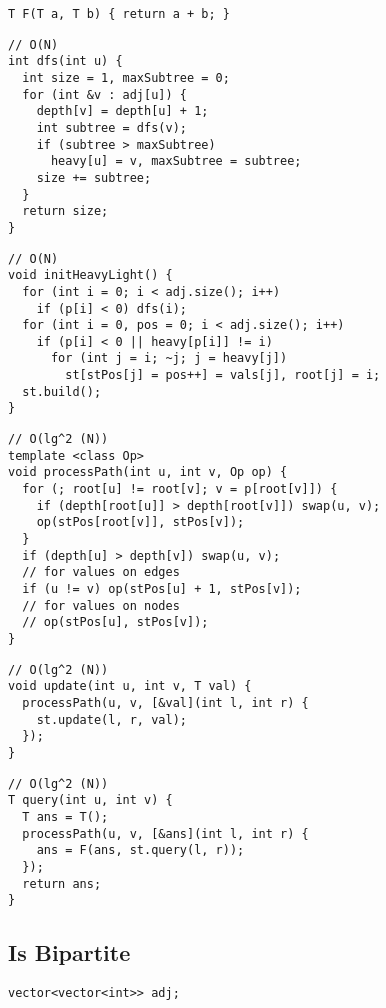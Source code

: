 \documentclass[twoside]{article}
\newcommand{\fileTitleStyle}{\large\underline}
\begin{document}
\begin{multicols*}{2}
\begin{verbatim}
T F(T a, T b) { return a + b; }
\end{verbatim}
\vspace{-12pt}
\begin{verbatim}
// O(N)
int dfs(int u) {
  int size = 1, maxSubtree = 0;
  for (int &v : adj[u]) {
    depth[v] = depth[u] + 1;
    int subtree = dfs(v);
    if (subtree > maxSubtree)
      heavy[u] = v, maxSubtree = subtree;
    size += subtree;
  }
  return size;
}
\end{verbatim}
\vspace{-12pt}
\begin{verbatim}
// O(N)
void initHeavyLight() {
  for (int i = 0; i < adj.size(); i++)
    if (p[i] < 0) dfs(i);
  for (int i = 0, pos = 0; i < adj.size(); i++)
    if (p[i] < 0 || heavy[p[i]] != i)
      for (int j = i; ~j; j = heavy[j])
        st[stPos[j] = pos++] = vals[j], root[j] = i;
  st.build();
}
\end{verbatim}
\vspace{-12pt}
\begin{verbatim}
// O(lg^2 (N))
template <class Op>
void processPath(int u, int v, Op op) {
  for (; root[u] != root[v]; v = p[root[v]]) {
    if (depth[root[u]] > depth[root[v]]) swap(u, v);
    op(stPos[root[v]], stPos[v]);
  }
  if (depth[u] > depth[v]) swap(u, v);
  // for values on edges
  if (u != v) op(stPos[u] + 1, stPos[v]);
  // for values on nodes
  // op(stPos[u], stPos[v]);
}
\end{verbatim}
\vspace{-12pt}
\begin{verbatim}
// O(lg^2 (N))
void update(int u, int v, T val) {
  processPath(u, v, [&val](int l, int r) {
    st.update(l, r, val);
  });
}
\end{verbatim}
\vspace{-12pt}
\begin{verbatim}
// O(lg^2 (N))
T query(int u, int v) {
  T ans = T();
  processPath(u, v, [&ans](int l, int r) {
    ans = F(ans, st.query(l, r));
  });
  return ans;
}
\end{verbatim}

\subsectionfont{\centering\bfseries\LARGE}
\subsectionfont{\fileTitleStyle}
\subsection*{Is Bipartite}
\begin{verbatim}
vector<vector<int>> adj;


\end{verbatim}
\end{multicols*}
\end{document}
